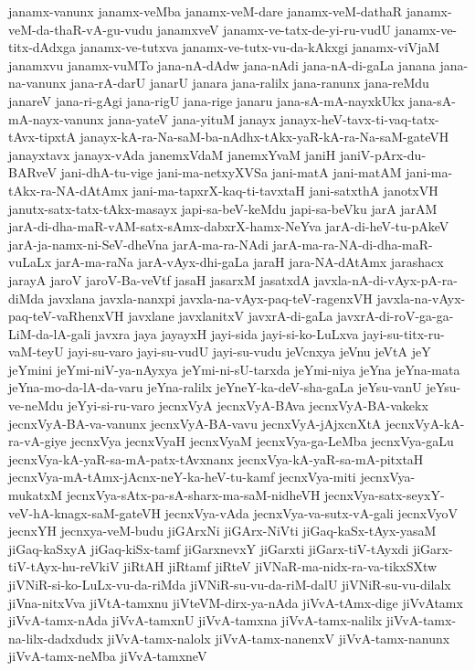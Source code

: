 {janamx-vanunx
janamx-veMba
janamx-veM-dare
janamx-veM-dathaR
janamx-veM-da-thaR-vA-gu-vudu
janamxveV
janamx-ve-tatx-de-yi-ru-vudU
janamx-ve-titx-dAdxga
janamx-ve-tutxva
janamx-ve-tutx-vu-da-kAkxgi
janamx-viVjaM
janamxvu
janamx-vuMTo
jana-nA-dAdw
jana-nAdi
jana-nA-di-gaLa
janana
jana-na-vanunx
jana-rA-darU
janarU
janara
jana-ralilx
jana-ranunx
jana-reMdu
janareV
jana-ri-gAgi
jana-rigU
jana-rige
janaru
jana-sA-mA-nayxkUkx
jana-sA-mA-nayx-vanunx
jana-yateV
jana-yituM
janayx
janayx-heV-tavx-ti-vaq-tatx-tAvx-tipxtA
janayx-kA-ra-Na-saM-ba-nAdhx-tAkx-yaR-kA-ra-Na-saM-gateVH
janayxtavx
janayx-vAda
janemxVdaM
janemxYvaM
janiH
janiV-pArx-du-BARveV
jani-dhA-tu-vige
jani-ma-netxyXVSa
jani-matA
jani-matAM
jani-ma-tAkx-ra-NA-dAtAmx
jani-ma-tapxrX-kaq-ti-tavxtaH
jani-satxthA
janotxVH
janutx-satx-tatx-tAkx-masayx
japi-sa-beV-keMdu
japi-sa-beVku
jarA
jarAM
jarA-di-dha-maR-vAM-satx-sAmx-dabxrX-hamx-NeYva
jarA-di-heV-tu-pAkeV
jarA-ja-namx-ni-SeV-dheVna
jarA-ma-ra-NAdi
jarA-ma-ra-NA-di-dha-maR-vuLaLx
jarA-ma-raNa
jarA-vAyx-dhi-gaLa
jaraH
jara-NA-dAtAmx
jarashacx
jarayA
jaroV
jaroV-Ba-veVtf
jasaH
jasarxM
jasatxdA
javxla-nA-di-vAyx-pA-ra-diMda
javxlana
javxla-nanxpi
javxla-na-vAyx-paq-teV-ragenxVH
javxla-na-vAyx-paq-teV-vaRhenxVH
javxlane
javxlanitxV
javxrA-di-gaLa
javxrA-di-roV-ga-ga-LiM-da-lA-gali
javxra
jaya
jayayxH
jayi-sida
jayi-si-ko-LuLxva
jayi-su-titx-ru-vaM-teyU
jayi-su-varo
jayi-su-vudU
jayi-su-vudu
jeVcnxya
jeVnu
jeVtA
jeY
jeYmini
jeYmi-niV-ya-nAyxya
jeYmi-ni-sU-tarxda
jeYmi-niya
jeYna
jeYna-mata
jeYna-mo-da-lA-da-varu
jeYna-ralilx
jeYneY-ka-deV-sha-gaLa
jeYsu-vanU
jeYsu-ve-neMdu
jeYyi-si-ru-varo
jecnxVyA
jecnxVyA-BAva
jecnxVyA-BA-vakekx
jecnxVyA-BA-va-vanunx
jecnxVyA-BA-vavu
jecnxVyA-jAjxcnXtA
jecnxVyA-kA-ra-vA-giye
jecnxVya
jecnxVyaH
jecnxVyaM
jecnxVya-ga-LeMba
jecnxVya-gaLu
jecnxVya-kA-yaR-sa-mA-patx-tAvxnanx
jecnxVya-kA-yaR-sa-mA-pitxtaH
jecnxVya-mA-tAmx-jAcnx-neY-ka-heV-tu-kamf
jecnxVya-miti
jecnxVya-mukatxM
jecnxVya-sAtx-pa-sA-sharx-ma-saM-nidheVH
jecnxVya-satx-seyxY-veV-hA-knagx-saM-gateVH
jecnxVya-vAda
jecnxVya-va-sutx-vA-gali
jecnxVyoV
jecnxYH
jecnxya-veM-budu
jiGArxNi
jiGArx-NiVti
jiGaq-kaSx-tAyx-yasaM
jiGaq-kaSxyA
jiGaq-kiSx-tamf
jiGarxnevxY
jiGarxti
jiGarx-tiV-tAyxdi
jiGarx-tiV-tAyx-hu-reVkiV
jiRtAH
jiRtamf
jiRteV
jiVNaR-ma-nidx-ra-va-tikxSXtw
jiVNiR-si-ko-LuLx-vu-da-riMda
jiVNiR-su-vu-da-riM-dalU
jiVNiR-su-vu-dilalx
jiVna-nitxVva
jiVtA-tamxnu
jiVteVM-dirx-ya-nAda
jiVvA-tAmx-dige
jiVvAtamx
jiVvA-tamx-nAda
jiVvA-tamxnU
jiVvA-tamxna
jiVvA-tamx-nalilx
jiVvA-tamx-na-lilx-dadxdudx
jiVvA-tamx-nalolx
jiVvA-tamx-nanenxV
jiVvA-tamx-nanunx
jiVvA-tamx-neMba
jiVvA-tamxneV
}

